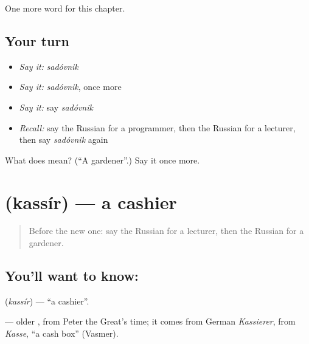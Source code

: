 \begin{grammarlens}[title={What you've built}]
One more word for this chapter.
\end{grammarlens}

\subsection*{Your turn}
\begin{itemize}
\raggedright
  \item \emph{Say it:} \emph{sadóvnik}
  \item \emph{Say it:} \emph{sadóvnik}, once more
  \item \emph{Say it:} say \emph{sadóvnik}
  \item \emph{Recall:} say the Russian for a programmer, then the Russian for a lecturer, then say \emph{sadóvnik} again
\end{itemize}

\begin{tcolorbox}[breakable,colback=teal!4,colframe=teal!35!black,title={Before you move on}]
What does  mean? (\textquotedblleft{}A gardener\textquotedblright{}.) Say it once more.
\end{tcolorbox}
\section[\texorpdfstring{\ru{кассир} (kassír)}{кассир (kassír)}]{ (kassír) — a cashier}

\label{lesson:RU-C230-kassir}



\begin{quote}
Before the new one: say the Russian for a lecturer, then the Russian for a gardener.
\end{quote}

\subsection*{You'll want to know: }
\textbf{} (\emph{kassír}) — \textquotedblleft{}a cashier\textquotedblright{}.

\begin{cousinweb}
\textbf{} — older \emph{}, from Peter the Great's time; it comes from German \emph{Kassierer}, from \emph{Kasse}, \textquotedblleft{}a cash box\textquotedblright{} (Vasmer).
\end{cousinweb}

